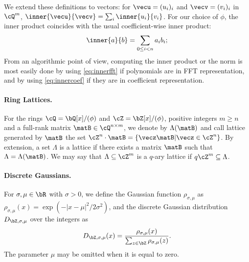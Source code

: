 We extend these definitions to vectors: for $\vecu = (u_i)_i$ and $\vecv = (v_i)_i$ in $\cQ^{m}$, $\inner{\vecu}{\vecv} = \sum_i \inner{u_i}{v_i}$.
For our choice of $\phi$, the inner product coincides with the usual coefficient-wise inner product:
\begin{equation}\label{eq:innercoef}
\inner{a}{b} = \sum_{0 \leq i < n} a_i b_i;
\end{equation}
From an algorithmic point of view, computing the inner product or the norm is most easily done by using \eqref{eq:innerfft} if polynomials are in FFT representation, and by using \eqref{eq:innercoef} if they are in coefficient representation.

\paragraph{Ring Lattices.} For the rings $\cQ = \bQ[x]/(\phi)$ and $\cZ = \bZ[x]/(\phi)$, positive integers $m \geq n$ and a full-rank matrix $\matB \in \cQ^{n\times m}$, we denote by $\Lambda(\matB)$ and call lattice generated by $\matB$ the set $\cZ^n \cdot \matB = \{ \vecz \matB | \vecz \in \cZ^{n}\}$. By extension, a set $\Lambda$ is a lattice if there exists a matrix $\matB$ such that $\Lambda = \Lambda(\matB)$. We may say that $\Lambda \subseteq \cZ^m$ is a $q$-ary lattice if $ q\cZ^m \subseteq \Lambda$.

\paragraph{Discrete Gaussians.} For $\sigma, \mu\in \bR$ with $\sigma >0$, we define the Gaussian function $\rho_{\sigma,\mu}$ as $\rho_{\sigma,\mu}(x) = \exp(-|x-\mu|^2/2\sigma^2)$, and the discrete Gaussian distribution $D_{\bZ,\sigma,\mu}$ over the integers as
\begin{equation}
D_{\bZ,\sigma,\mu}(x) = \frac{\rho_{\sigma,\mu}(x)}{ \sum_{z \in \bZ} \rho_{\sigma,\mu}(z) } .
\end{equation}
The parameter $\mu$ may be omitted when it is equal to zero.


